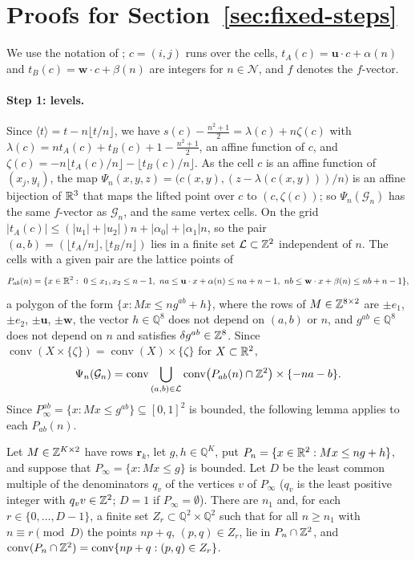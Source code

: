\section{Proofs for Section~\ref{sec:fixed-steps}}
\label{sec:app-fixed-steps}

We use the notation of ; $c=(i,j)$ runs over the cells, $t_A(c)=\mathbf u\cdot c+\alpha(n)$ and $t_B(c)=\mathbf w\cdot c+\beta(n)$ are integers for $n\in\mathcal N$, and $f$ denotes the $f$-vector.

\paragraph{Step 1: levels.}
Since $\langle t\rangle=t-n\lfloor t/n\rfloor$, we have $s(c)-\frac{n^2+1}2=\lambda(c)+n\zeta(c)$ with $\lambda(c)=nt_A(c)+t_B(c)+1-\frac{n^2+1}2$, an affine function of $c$, and $\zeta(c)=-n\lfloor t_A(c)/n\rfloor-\lfloor t_B(c)/n\rfloor$.
As the cell $c$ is an affine function of $(x_j,y_i)$, the map $\Psi_n(x,y,z)=\bigl(c(x,y),(z-\lambda(c(x,y)))/n\bigr)$ is an affine bijection of $\mathbb{R}^3$ that maps the lifted point over $c$ to $(c,\zeta(c))$; so $\Psi_n(\mathcal G_n)$ has the same $f$-vector as $\mathcal G_n$, and the same vertex cells.
On the grid $|t_A(c)|\le(|u_1|+|u_2|)n+|\alpha_0|+|\alpha_1|n$, so the pair $(a,b)=(\lfloor t_A/n\rfloor,\lfloor t_B/n\rfloor)$ lies in a finite set $\mathcal L\subset\mathbb{Z}^2$ independent of $n$.
The cells with a given pair are the lattice points of
\[
P_{ab}(n)=\{x\in\R^2:\ 0\le x_1,x_2\le n-1,\ na\le\mathbf u\cdot x+\alpha(n)\le na+n-1,\ nb\le\mathbf w\cdot x+\beta(n)\le nb+n-1\},
\]
a polygon of the form $\{x:Mx\le ng^{ab}+h\}$, where the rows of $M\in\mathbb{Z}^{8\times2}$ are $\pm e_1$, $\pm e_2$, $\pm\mathbf u$, $\pm\mathbf w$, the vector $h\in\mathbb Q^8$ does not depend on $(a,b)$ or $n$, and $g^{ab}\in\mathbb Q^8$ does not depend on $n$ and satisfies $\delta g^{ab}\in\mathbb{Z}^8$.
Since $\operatorname{conv}(X\times\{\zeta\})=\operatorname{conv}(X)\times\{\zeta\}$ for $X\subset\mathbb{R}^2$,
\begin{equation}
\label{eq:levels}
\Psi_n(\mathcal G_n)=\operatorname{conv}\bigcup_{(a,b)\in\mathcal L}\operatorname{conv}\bigl(P_{ab}(n)\cap\mathbb{Z}^2\bigr)\times\{-na-b\}.
\end{equation}
Since $P_\infty^{ab}=\{x:Mx\le g^{ab}\}\subseteq[0,1]^2$ is bounded, the following lemma applies to each $P_{ab}(n)$.

\begin{lemma}
\label{lem:linear-polygons}
Let $M\in\mathbb{Z}^{K\times2}$ have rows $\mathbf r_k$, let $g,h\in\mathbb Q^K$, put $P_n=\{x\in\mathbb{R}^2:Mx\le ng+h\}$, and suppose that $P_\infty=\{x:Mx\le g\}$ is bounded.
Let $D$ be the least common multiple of the denominators $q_v$ of the vertices $v$ of $P_\infty$ ($q_v$ is the least positive integer with $q_vv\in\mathbb{Z}^2$; $D=1$ if $P_\infty=\emptyset$).
There are $n_1$ and, for each $r\in\{0,\dots,D-1\}$, a finite set $Z_r\subset\mathbb Q^2\times\mathbb Q^2$ such that for all $n\ge n_1$ with $n\equiv r\pmod D$ the points $np+q$, $(p,q)\in Z_r$, lie in $P_n\cap\mathbb{Z}^2$, and $\operatorname{conv}(P_n\cap\mathbb{Z}^2)=\operatorname{conv}\{np+q:(p,q)\in Z_r\}$.
\end{lemma}

